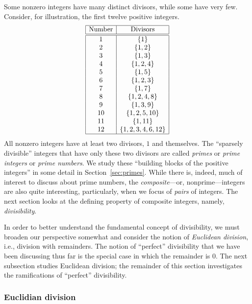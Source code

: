 Some nonzero integers have many distinct divisors, while some have
very few.  Consider, for illustration, the first twelve positive
integers.
\[ \begin{array}{|c|c|}
\hline
\mbox{Number} & \mbox{Divisors} \\
\hline
\hline
1  &  \{ 1 \} \\
2  &  \{ 1, 2 \} \\
3  &  \{ 1, 3 \} \\
4  &  \{ 1, 2, 4 \} \\
5  &  \{ 1, 5 \} \\
6  &  \{ 1, 2, 3 \} \\
7  &  \{ 1, 7 \} \\
8  &  \{ 1, 2, 4, 8 \} \\
9  &  \{ 1, 3, 9 \} \\
10  & \{ 1, 2, 5, 10 \} \\
11  & \{ 1, 11 \} \\
12  & \{ 1, 2, 3, 4, 6, 12 \} \\
\hline
\end{array}
\]
All nonzero integers have at least two divisors, $1$ and themselves.
The ``sparsely divisible'' integers that have only these two divisors
are called {\it primes} or {\it prime
  integers} or {\it prime numbers}.  We study these ``building blocks
of the positive integers'' in some detail in Section~\ref{sec:primes}.
While there is, indeed, much of interest to discuss about prime
numbers, the  {\it composite}---or,
nonprime---integers are also quite interesting, particularly, when we
focus of {\em pairs} of integers.  The next section looks at the
defining property of composite integers, namely, {\em divisibility}.

\medskip

In order to better understand the fundamental concept of divisibility,
we must broaden our perspective somewhat and consider the notion of
{\em Euclidean division},  i.e., division
with remainders.  The notion of ``perfect'' divisibility that we have
been discussing thus far is the special case in which the remainder is
$0$.  The next subsection studies Euclidean division; the remainder of
this section investigates the ramifications of ``perfect''
divisibility.

\subsubsection{Euclidian division}
\label{sec:euclidian}

